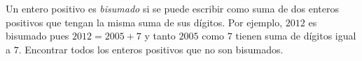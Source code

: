 Un entero positivo es \emph{bisumado} si se puede escribir como suma de dos enteros positivos que tengan la misma suma de sus dígitos. Por ejemplo, $2012$ es bisumado pues $2012 = 2005+7$ y tanto $2005$ como $7$ tienen suma de dígitos igual a $7$. Encontrar todos los enteros positivos que no son bisumados.

